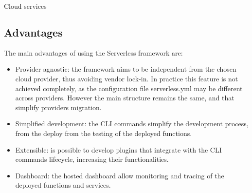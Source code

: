 \begin{chapter}{Cloud services}
    \subsection{Advantages}
    The main advantages of using the Serverless framework are:
    \begin{itemize}
        \item Provider agnostic: the framework aims to be independent from the chosen
            cloud provider, thus avoiding vendor lock-in. In practice this feature is
            not achieved completely, as the configuration file serverless.yml may be
            different across providers. However the main structure remains the same,
            and that simplify providers migration.
        \item Simplified development: the CLI commands simplify the development process,
            from the deploy from the testing of the deployed functions.
        \item Extensible: is possible to develop plugins that integrate with the
            CLI commands lifecycle, increasing their functionalities.
        \item Dashboard: the hosted dashboard allow monitoring and tracing of the
            deployed functions and services.
    \end{itemize}


\end{chapter}
